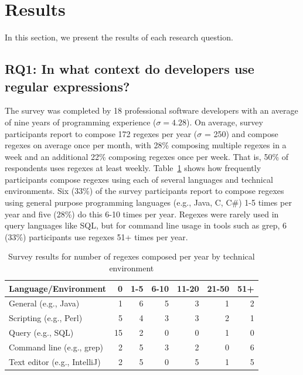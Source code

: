 \section{Results}
\label{sec:results}



In this section, we present the results of each research question.

\subsection{RQ1: In what context do developers use regular expressions?}
\label{rq1:survey}

The survey was completed by 18 professional software developers with an average of nine years of programming experience ($\sigma = 4.28$).
On average, survey participants report to compose 172 regexes per year ($\sigma$ = 250) and compose regexes on average once per month, with 28\% composing multiple regexes in a week and an additional 22\% composing regexes once per week. That is, 50\% of respondents uses regexes at least weekly.
Table~\ref{tab:regexenviron} shows how frequently participants compose regexes using each of several languages and technical environments.
Six (33\%) of the survey participants report to compose regexes using general purpose programming languages (e.g., Java, C, C\#) 1-5 times per year and five (28\%) do this 6-10 times per year.  Regexes were rarely used in query languages like SQL, but for command line usage in tools such as grep, 6 (33\%) participants use regexes 51+ times per year.

\newcommand{\horiz}{\hspace{2.1pt}}

\begin{table}
\caption{Survey results for number of regexes composed per year by technical environment \label{tab:regexenviron}}
\begin{center}
\begin{small}
\begin{tabular}{l | r @{  \horiz} r @{ \horiz } r @{ \horiz } r @{ \horiz } r @{ \horiz } r }
Language/Environment & 0 & 1-5 & 6-10 & 11-20 & 21-50 & 51+ \\ \hline
General  (e.g., Java)  & 1 & 6 & 5 & 3& 1& 2 \\
Scripting  (e.g., Perl) &5 &4 &3 &3 &2  &1 \\
Query  (e.g., SQL) & 15&2 &0 &0 &1  & 0\\
Command line (e.g., grep)   &2 &5 &3 &2 &0  &6 \\
Text editor (e.g., IntelliJ)   & 2& 5& 0& 5& 1& 5\\
\end{tabular}
\end{small}
\end{center}
\end{table}

